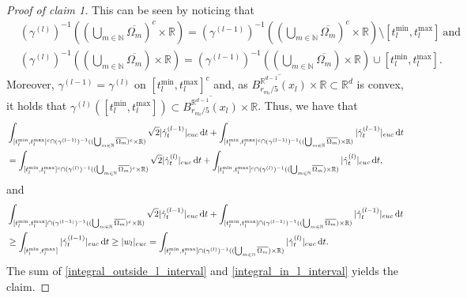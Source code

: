 \documentclass[a4paper,10pt]{article}
\numberwithin{equation}{section}
\newcommand{\R}{\mathbb{R}}
\newcommand{\N}{\mathbb{N}}
\newcommand{\di}{{\rm d}}
\begin{document}
\begin{proof}[Proof of claim 1]
This can be seen by noticing that 
\begin{align}\label{preimages_varying_in_lth_transformation_of_curve}
    &(\gamma^{(l)})^{-1}((\bigcup_{m\in \N}\overline{\Omega_m})^c\times \R) = (\gamma^{(l-1)})^{-1}((\bigcup_{m\in \N}\overline{\Omega_m})^c\times \R) \setminus [t_l^{\min}, t_l^{\max}] \ \mathrm{and} \nonumber \\
    &(\gamma^{(l)})^{-1}((\bigcup_{m\in \N}\overline{\Omega_m})\times \R) = (\gamma^{(l-1)})^{-1}((\bigcup_{m\in \N}\overline{\Omega_m})\times \R) \cup [t_l^{\min}, t_l^{\max}].
\end{align}
Moreover, $\gamma^{(l-1)} = \gamma^{(l)}$ on $[t_l^{\min}, t_l^{\max}]^c$ and, as $\overline{B^{\R^{d-1}}_{r_{m_l}/5}(x_l)} \times \R \subset \R^d$ is convex, it holds that $\gamma^{(l)}([t_l^{\min}, t_l^{\max}]) \subset \overline{B^{\R^{d-1}}_{r_{m_l}/5}(x_l)} \times \R$. Thus, we have that
\begin{align}\label{integral_outside_l_interval}
    &\int_{[t_l^{\min}, t_l^{\max}]^c \cap (\gamma^{(l-1)})^{-1}((\bigcup_{m\in \N}\overline{\Omega_m})^c\times \R)} \sqrt{2}|\dot{\gamma}^{(l-1)}_t|_{euc} \, \di t + \int_{[t_l^{\min}, t_l^{\max}]^c \cap(\gamma^{(l-1)})^{-1}((\bigcup_{m\in \N}\overline{\Omega_m})\times \R)} |\dot{\gamma}^{(l-1)}_t|_{euc} \, \di t \nonumber \\
    &= \int_{[t_l^{\min}, t_l^{\max}]^c \cap(\gamma^{(l)})^{-1}((\bigcup_{m\in \N}\overline{\Omega_m})^c\times \R)} \sqrt{2}|\dot{\gamma}^{(l)}_t|_{euc} \, \di t + \int_{[t_l^{\min}, t_l^{\max}]^c \cap(\gamma^{(l)})^{-1}((\bigcup_{m\in \N}\overline{\Omega_m})\times \R)} |\dot{\gamma}^{(l)}_t|_{euc} \, \di t,
\end{align}
and 
\begin{align}\label{integral_in_l_interval}
    &\int_{[t_l^{\min}, t_l^{\max}] \cap (\gamma^{(l-1)})^{-1}((\bigcup_{m\in \N}\overline{\Omega_m})^c\times \R)} \sqrt{2}|\dot{\gamma}^{(l-1)}_t|_{euc} \, \di t + \int_{[t_l^{\min}, t_l^{\max}] \cap(\gamma^{(l-1)})^{-1}((\bigcup_{m\in \N}\overline{\Omega_m})\times \R)} |\dot{\gamma}^{(l-1)}_t|_{euc} \, \di t \nonumber \\
    &\geq \int_{[t_l^{\min}, t_l^{\max}]}|\dot{\gamma}_t^{(l-1)}|_{euc} \, \di t \geq |w_l|_{euc}=  \int_{[t_l^{\min}, t_l^{\max}] \cap(\gamma^{(l)})^{-1}((\bigcup_{m\in \N}\overline{\Omega_m})\times \R)} |\dot{\gamma}^{(l)}_t|_{euc} \, \di t.
\end{align}
The sum of \eqref{integral_outside_l_interval} and \eqref{integral_in_l_interval} yields the claim.
\end{proof}
\end{document}
